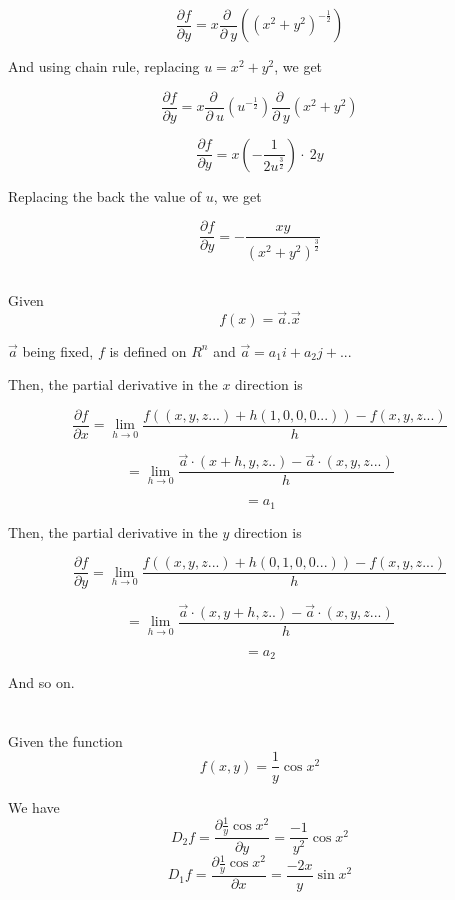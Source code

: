 \documentclass[11pt]{article}
\begin{document}
$$\frac{\partial f}{\partial y} = x\frac{\partial \:}{\partial \:y}\left(\left(x^2+y^2\right)^{-\frac{1}{2}}\right)$$

And using chain rule, replacing $u = x^{2} + y^{2}$, we get

$$\frac{\partial f}{\partial y} = x\frac{\partial \:}{\partial \:u}\left(u^{-\frac{1}{2}}\right)\frac{\partial \:}{\partial \:y}\left(x^2+y^2\right)$$

$$\frac{\partial f}{\partial y} = x\left(-\frac{1}{2u^{\frac{3}{2}}}\right)\cdot \:2y$$

Replacing the back the value of $u$, we get

$$\frac{\partial f}{\partial y} = -\frac{xy}{\left(x^2+y^2\right)^{\frac{3}{2}}}$$

\subsection{}

Given $$f(x) = \vec{a}.\vec{x}$$

$\vec{a}$ being fixed, $f$ is defined on $R^{n}$ and $\vec{a} = a_{1}i + a_{2}j + ...$

Then, the partial derivative in the $x$ direction is

$$\frac{\partial f}{\partial x} = \lim_{h\to0}\frac{f((x,y,z...) + h(1,0,0,0...)) - f(x,y,z...)}{h}$$

$$= \lim_{h\to0}\frac{\vec{a}\cdot(x+h,y,z..) - \vec{a}\cdot(x,y,z...)}{h}$$

$$= a_{1}$$

Then, the partial derivative in the $y$ direction is

$$\frac{\partial f}{\partial y} = \lim_{h\to0}\frac{f((x,y,z...) + h(0,1,0,0...)) - f(x,y,z...)}{h}$$

$$= \lim_{h\to0}\frac{\vec{a}\cdot(x,y+h,z..) - \vec{a}\cdot(x,y,z...)}{h}$$

$$= a_{2}$$

And so on.


\section{}

Given the function $$f(x,y) = \frac{1}{y}\cos{x^{2}}$$

We have $$D_{2}f = \frac{\partial \frac{1}{y}\cos{x^{2}}}{\partial y} = \frac{-1}{y^{2}}\cos{x^{2}}$$ $$D_{1}f = \frac{\partial \frac{1}{y}\cos{x^{2}}}{\partial x} = \frac{-2x}{y}\sin{x^{2}}$$
\end{document}
